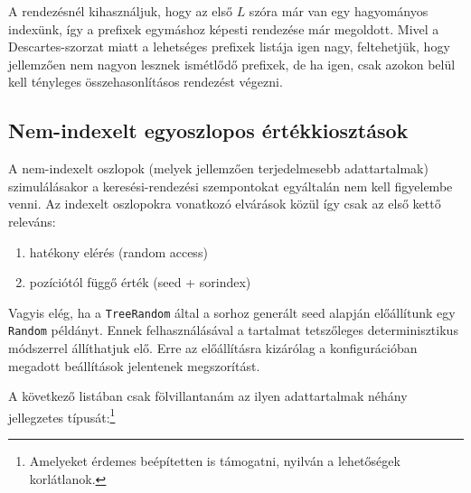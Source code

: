 \documentclass[
    parspace, %
    noindent, %
]{elteiktdk}[2023/04/10]
\begin{document}
A rendezésnél kihasználjuk, hogy az első $L$ szóra már van egy hagyományos indexünk,
így a prefixek egymáshoz képesti rendezése már megoldott.
Mivel a Descartes-szorzat miatt a lehetséges prefixek listája igen nagy,
feltehetjük, hogy jellemzően nem nagyon lesznek ismétlődő prefixek,
de ha igen, csak azokon belül kell tényleges összehasonlításos rendezést végezni.

\subsection{Nem-indexelt egyoszlopos értékkiosztások}

A nem-indexelt oszlopok (melyek jellemzően terjedelmesebb adattartalmak)
szimulálásakor a keresési-rendezési szempontokat egyáltalán nem kell figyelembe venni.
Az indexelt oszlopokra vonatkozó elvárások közül így csak az első kettő releváns:

\begin{enumerate}
  \item hatékony elérés (random access)
  \item pozíciótól függő érték (seed + sorindex)
\end{enumerate}

Vagyis elég, ha a \texttt{TreeRandom} által a sorhoz generált seed alapján
előállítunk egy \texttt{Random} példányt.
Ennek felhasználásával a tartalmat tetszőleges determinisztikus módszerrel állíthatjuk elő.
Erre az előállításra kizárólag a konfigurációban megadott beállítások jelentenek megszorítást.

A következő listában csak fölvillantanám az ilyen adattartalmak néhány jellegzetes típusát:\footnote{
  Amelyeket érdemes beépítetten is támogatni, nyilván a lehetőségek korlátlanok.
}
\end{document}
